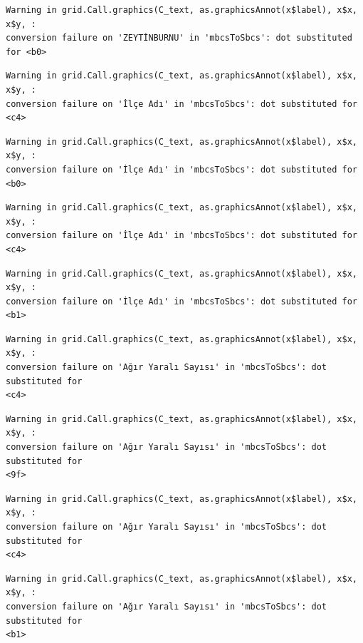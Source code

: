\documentclass[
  11pt,
  a4paper,
  DIV=11,
  numbers=noendperiod]{scrartcl}
\begin{document}
\begin{verbatim}
Warning in grid.Call.graphics(C_text, as.graphicsAnnot(x$label), x$x, x$y, :
conversion failure on 'ZEYTİNBURNU' in 'mbcsToSbcs': dot substituted for <b0>
\end{verbatim}

\begin{verbatim}
Warning in grid.Call.graphics(C_text, as.graphicsAnnot(x$label), x$x, x$y, :
conversion failure on 'İlçe Adı' in 'mbcsToSbcs': dot substituted for <c4>
\end{verbatim}

\begin{verbatim}
Warning in grid.Call.graphics(C_text, as.graphicsAnnot(x$label), x$x, x$y, :
conversion failure on 'İlçe Adı' in 'mbcsToSbcs': dot substituted for <b0>
\end{verbatim}

\begin{verbatim}
Warning in grid.Call.graphics(C_text, as.graphicsAnnot(x$label), x$x, x$y, :
conversion failure on 'İlçe Adı' in 'mbcsToSbcs': dot substituted for <c4>
\end{verbatim}

\begin{verbatim}
Warning in grid.Call.graphics(C_text, as.graphicsAnnot(x$label), x$x, x$y, :
conversion failure on 'İlçe Adı' in 'mbcsToSbcs': dot substituted for <b1>
\end{verbatim}

\begin{verbatim}
Warning in grid.Call.graphics(C_text, as.graphicsAnnot(x$label), x$x, x$y, :
conversion failure on 'Ağır Yaralı Sayısı' in 'mbcsToSbcs': dot substituted for
<c4>
\end{verbatim}

\begin{verbatim}
Warning in grid.Call.graphics(C_text, as.graphicsAnnot(x$label), x$x, x$y, :
conversion failure on 'Ağır Yaralı Sayısı' in 'mbcsToSbcs': dot substituted for
<9f>
\end{verbatim}

\begin{verbatim}
Warning in grid.Call.graphics(C_text, as.graphicsAnnot(x$label), x$x, x$y, :
conversion failure on 'Ağır Yaralı Sayısı' in 'mbcsToSbcs': dot substituted for
<c4>
\end{verbatim}

\begin{verbatim}
Warning in grid.Call.graphics(C_text, as.graphicsAnnot(x$label), x$x, x$y, :
conversion failure on 'Ağır Yaralı Sayısı' in 'mbcsToSbcs': dot substituted for
<b1>
\end{verbatim}
\end{document}
